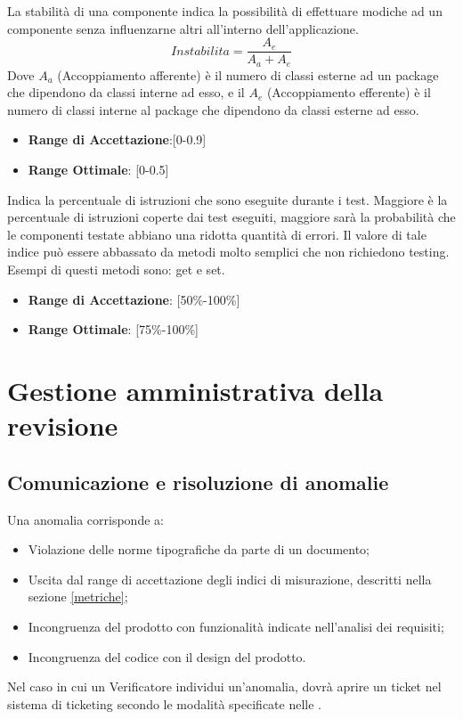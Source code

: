 \documentclass[12pt,a4paper]{article}
\begin{document}
La stabilità di una componente indica la possibilità di effettuare modiche ad un componente senza influenzarne altri all’interno dell'applicazione.
\[Instabilita=\frac{A_e}{A_a+A_e}\]
Dove $A_a$ (Accoppiamento afferente) è il numero di classi esterne ad un package che dipendono da classi interne ad esso, e il $A_e$ (Accoppiamento efferente) è il numero di classi interne al package che dipendono da classi esterne ad esso.
\begin{itemize}
\item \textbf{Range di Accettazione}:[0-0.9]
\item \textbf{Range Ottimale}: [0-0.5]
\end{itemize}
Indica la percentuale di istruzioni che sono eseguite durante i test. Maggiore è la percentuale di istruzioni coperte dai test eseguiti, maggiore sarà la probabilità che le componenti testate abbiano una ridotta quantità di errori. Il valore di tale indice può essere abbassato da metodi molto semplici che non richiedono testing. Esempi di questi metodi sono: get e set.
\begin{itemize}
\item \textbf{Range di Accettazione}: [50\%-100\%]
\item \textbf{Range Ottimale}: [75\%-100\%]
\end{itemize}

\newpage
\section{Gestione amministrativa della revisione}
\subsection{Comunicazione e risoluzione di anomalie}
Una anomalia corrisponde a:
\begin{itemize}
\item Violazione delle norme tipografiche da parte di un documento;
\item Uscita dal range di accettazione degli indici di misurazione, descritti nella sezione \ref{metriche};
\item Incongruenza del prodotto con funzionalità indicate nell’analisi dei requisiti;
\item Incongruenza del codice con il design del prodotto.
\end{itemize}
Nel caso in cui un Verificatore individui un’anomalia, dovrà aprire un ticket nel sistema di ticketing secondo le modalità specificate nelle \NdP.
\end{document}
